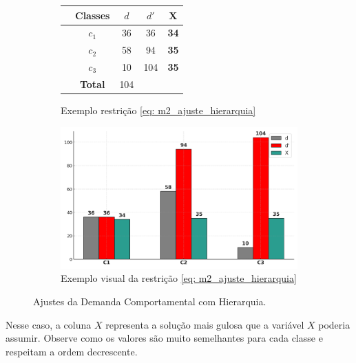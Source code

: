 \begin{figure}[H]
	\centering
	\begin{subfigure}[b]{0.45\linewidth}
		\centering
		\begin{tabular}{lcccc}
			\toprule
			\textbf{} & \textbf{Classes} & \textbf{$d$} & \textbf{$d'$} & \textbf{X} \\
			\midrule
			& $c_1$ & 36  & 36  & \textbf{34} \\
			& $c_2$ & 58  & 94  & \textbf{35} \\
			& $c_3$ & 10  & 104 & \textbf{35} \\
			\midrule
			& \textbf{Total} & 104 & & \\
			\bottomrule
		\end{tabular}
		\caption{Exemplo restrição  \ref{eq: m2_ajuste_hierarquia}}
		\label{tab:exe_ajuste_dem_hierarquia}
	\end{subfigure}\hspace{5mm}
	\begin{subfigure}[b]{0.45\linewidth}
		\centering
		\includegraphics[width=\linewidth]{img/dem_hierar.png}
		\caption{Exemplo visual da restrição \ref{eq: m2_ajuste_hierarquia}}
		\label{fig:dem_classes}
	\end{subfigure}
	\caption{Ajustes da Demanda Comportamental com Hierarquia.}
	\label{fig:ajustes_demanda_hierar}
\end{figure}

Nesse caso, a coluna $X$ representa a solução mais gulosa que a variável $X$ poderia assumir. Observe como os valores são muito semelhantes para cada classe e respeitam a ordem decrescente.


